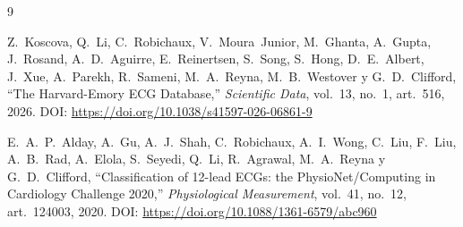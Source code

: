 \documentclass[11pt,a4paper]{article}
\begin{document}
\vspace*{2.0cm}
\renewcommand{\refname}{\LARGE 7. Referencias Bibliográficas}
\begin{thebibliography}{9}

Z.~Koscova, Q.~Li, C.~Robichaux, V.~Moura~Junior, M.~Ghanta, A.~Gupta, J.~Rosand, A.~D.~Aguirre, E.~Reinertsen, S.~Song, S.~Hong, D.~E.~Albert, J.~Xue, A.~Parekh, R.~Sameni, M.~A.~Reyna, M.~B.~Westover y G.~D.~Clifford,
``The Harvard-Emory ECG Database,''
\textit{Scientific Data}, vol.~13, no.~1, art.~516, 2026. DOI: \url{https://doi.org/10.1038/s41597-026-06861-9}

\vspace{0.8cm}
E.~A.~P.~Alday, A.~Gu, A.~J.~Shah, C.~Robichaux, A.~I.~Wong, C.~Liu, F.~Liu, A.~B.~Rad, A.~Elola, S.~Seyedi, Q.~Li, R.~Agrawal, M.~A.~Reyna y G.~D.~Clifford,
``Classification of 12-lead ECGs: the PhysioNet/Computing in Cardiology Challenge 2020,''
\textit{Physiological Measurement}, vol.~41, no.~12, art.~124003, 2020. DOI: \url{https://doi.org/10.1088/1361-6579/abc960}

\end{thebibliography}
\end{document}

